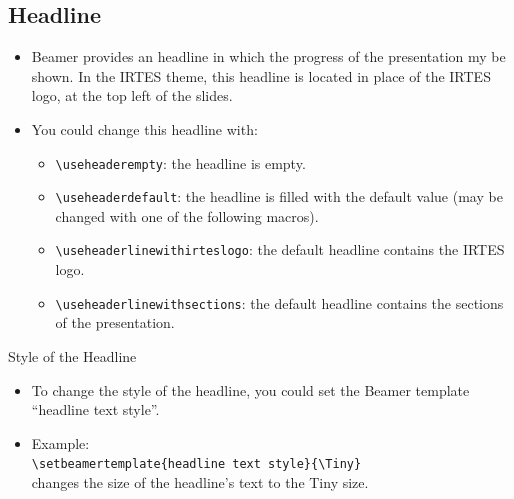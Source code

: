 \documentclass[english,circlenumberstyle]{irtesbeamer}
\begin{document}
\subsection{Headline}
\begin{frame}{\subsecname}
	\begin{footnotesize}
	\begin{itemize}
	\item Beamer provides an headline in which the progress of the presentation my be shown.
	In the IRTES theme, this headline is located in place of the IRTES logo, at the top left of the slides.
	\item You could change this headline with: \begin{itemize}\footnotesize
		\item \texttt{{\textbackslash}useheaderempty}: the headline is empty.
		\item \texttt{{\textbackslash}useheaderdefault}: the headline is filled with the default value (may be changed with one of the following macros).
		\item \texttt{{\textbackslash}useheaderlinewithirteslogo}: the default headline contains the IRTES logo.
		\item \texttt{{\textbackslash}useheaderlinewithsections}: the default headline contains the sections of the presentation.
		\end{itemize}
	\end{itemize}
	\end{footnotesize}
\end{frame}

\begin{frame}{Style of the Headline}
	\begin{itemize}
	\item To change the style of the headline, you could set the Beamer template ``headline text style''.
	\item Example: \\
		\texttt{{\textbackslash}setbeamertemplate\{headline text style\}\{{\textbackslash}Tiny\}} \\
		changes the size of the headline's text to the Tiny size.
	\end{itemize}
\end{frame}
\end{document}
